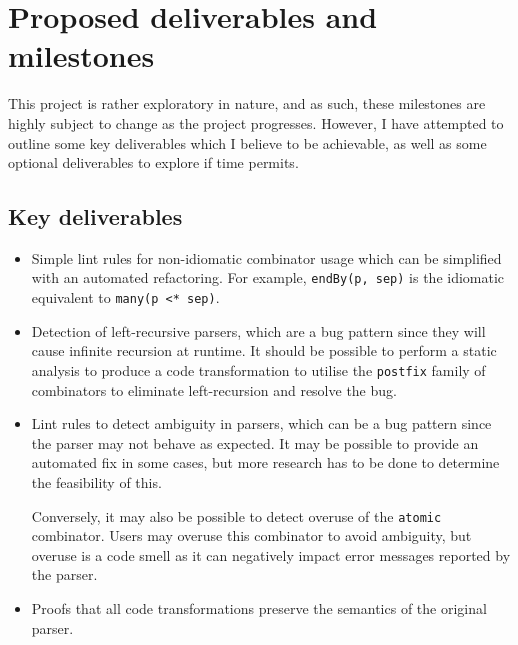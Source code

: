 \documentclass[../../main.tex]{subfiles}
\begin{document}
\section{Proposed deliverables and milestones}
This project is rather exploratory in nature, and as such, these milestones are highly subject to change as the project progresses.
However, I have attempted to outline some key deliverables which I believe to be achievable, as well as some optional deliverables to explore if time permits.

\subsection{Key deliverables}
\begin{itemize}
  \item
  Simple lint rules for non-idiomatic combinator usage which can be simplified with an automated refactoring.
  For example, \texttt{endBy(p, sep)} is the idiomatic equivalent to \texttt{many(p <* sep)}.
  \item
  Detection of left-recursive parsers, which are a bug pattern since they will cause infinite recursion at runtime.
  It should be possible to perform a static analysis to produce a code transformation to utilise the \texttt{postfix} family of combinators to eliminate left-recursion and resolve the bug.
  \item
  Lint rules to detect ambiguity in parsers, which can be a bug pattern since the parser may not behave as expected.
  It may be possible to provide an automated fix in some cases, but more research has to be done to determine the feasibility of this.

  Conversely, it may also be possible to detect overuse of the \texttt{atomic} combinator.
  Users may overuse this combinator to avoid ambiguity, but overuse is a code smell as it can negatively impact error messages reported by the parser.
  \item
  Proofs that all code transformations preserve the semantics of the original parser.
\end{itemize}
\end{document}
